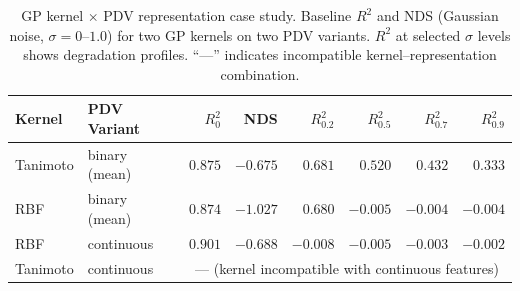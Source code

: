 \begin{table}[htbp]
\centering
\caption{GP kernel $\times$ PDV representation case study. Baseline $R^2$ and NDS (Gaussian noise, $\sigma = 0$--$1.0$) for two GP kernels on two PDV variants. $R^2$ at selected $\sigma$ levels shows degradation profiles. ``---'' indicates incompatible kernel--representation combination.}
\label{tab:pdv_casestudy}
\small
\begin{tabular}{llrrrrrr}
\toprule
\textbf{Kernel} & \textbf{PDV Variant} & \textbf{$R^2_0$} & \textbf{NDS} & \textbf{$R^2_{0.2}$} & \textbf{$R^2_{0.5}$} & \textbf{$R^2_{0.7}$} & \textbf{$R^2_{0.9}$} \\
\midrule
Tanimoto & binary (mean)  & $0.875$ & $-0.675$ & $0.681$ & $0.520$ & $0.432$ & $0.333$ \\
RBF      & binary (mean)  & $0.874$ & $-1.027$ & $0.680$ & $-0.005$ & $-0.004$ & $-0.004$ \\
RBF      & continuous     & $0.901$ & $-0.688$ & $-0.008$ & $-0.005$ & $-0.003$ & $-0.002$ \\
Tanimoto & continuous     & \multicolumn{6}{c}{--- (kernel incompatible with continuous features)} \\
\bottomrule
\end{tabular}
\end{table}

